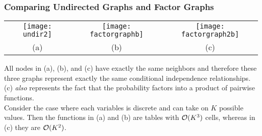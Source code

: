 \begin{frame}
\frametitle{Comparing Undirected Graphs and Factor Graphs}

\begin{center}
\begin{tabular}{ccc}
\texttt{[image: undir2]} &
\texttt{[image: factorgraphb]} &
\texttt{[image: factorgraph2b]} \\
(a) & (b) & (c) 
\end{tabular}
\end{center}

\vspace{1ex}

All nodes in (a), (b), and (c) have exactly the same neighbors and
therefore these three graphs represent exactly the same conditional
independence relationships. \\

(c) {\em also} represents the fact that the probability factors
into a product of pairwise functions. \\

Consider the case where each variables is discrete and can take on
$K$ possible values. Then the functions in (a) and (b) are tables with
${\cal O}(K^3)$ cells, whereas in (c) they are ${\cal O}(K^2)$. 




\end{frame}

